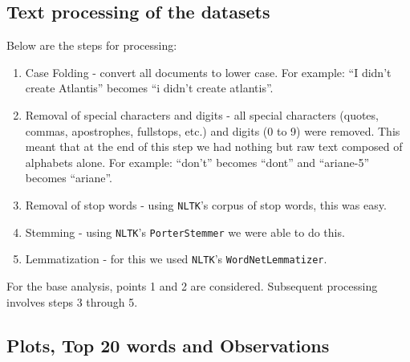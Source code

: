 \documentclass{article}
\begin{document}
\subsection{Text processing of the datasets}
\begin{flushleft}
Below are the steps for processing:
\begin{enumerate}
\item Case Folding - convert all documents to lower case. For example: ``I didn't create Atlantis'' becomes ``i didn't create atlantis''.
\item Removal of special characters and digits - all special characters (quotes, commas, apostrophes, fullstops, etc.) and digits (0 to 9) were removed. This meant that at the end of this step we had nothing but raw text composed of alphabets alone. For example: ``don't'' becomes ``dont'' and ``ariane-5'' becomes ``ariane''.
\item Removal of stop words - using \texttt{NLTK}'s corpus of stop words, this was easy.
\item Stemming - using \texttt{NLTK}'s \texttt{PorterStemmer} we were able to do this.
\item Lemmatization - for this we used \texttt{NLTK}'s \texttt{WordNetLemmatizer}.
\end{enumerate}

For the base analysis, points 1 and 2 are considered. Subsequent processing involves steps 3 through 5.
\end{flushleft}
\newpage

\subsection{Plots, Top 20 words and Observations}
\end{document}
